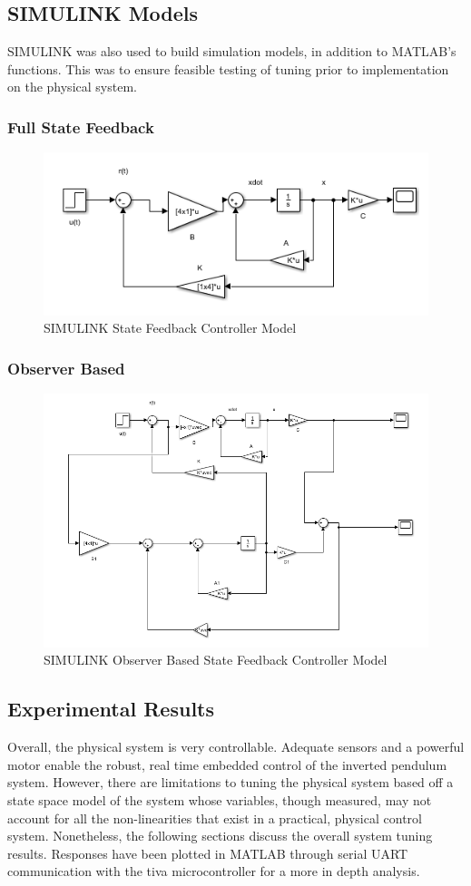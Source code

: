 \documentclass[12pt]{article}
\begin{document}
\subsection{SIMULINK Models}
SIMULINK was also used to build simulation models, in addition to MATLAB's functions. This was to ensure feasible testing of tuning prior to implementation on the physical system.
\subsubsection{Full State Feedback}
\begin{figure}[H]
    \centering
    \includegraphics[width=0.7\linewidth]{figures/Feedback.PNG}
    \caption{SIMULINK State Feedback Controller Model}
    \label{fig:sim}
\end{figure}
\subsubsection{Observer Based}
\begin{figure}[H]
    \centering
    \includegraphics[width=0.9\linewidth]{figures/obs.PNG}
    \caption{SIMULINK Observer Based State Feedback Controller Model}
    \label{fig:sim}
\end{figure}
\subsection{Experimental Results}
Overall, the physical system is very controllable. Adequate sensors and a powerful motor enable the robust, real time embedded control of the inverted pendulum system. However, there are limitations to tuning the physical system based off a state space model of the system whose variables, though measured, may not account for all the non-linearities that exist in a practical, physical control system. Nonetheless, the following sections discuss the overall system tuning results. Responses have been plotted in MATLAB through serial UART communication with the tiva microcontroller for a more in depth analysis.
\end{document}
